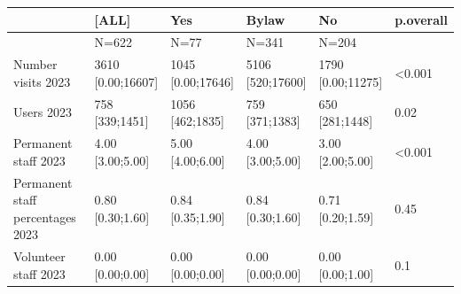 \documentclass[a4paper,
fontsize=11pt,
oneside,
numbers=noperiodatend,
parskip=half-,
bibliography=totoc,
final
]{scrartcl}
\begin{document}
\begin{landscape}
\begin{table}[]\centering
\begin{tabular}{|l|l|l|l|l|l|}
\hline
                                 & \textbf{{[}ALL{]}}       & \textbf{Yes}             & \textbf{Bylaw}           & \textbf{No}            & \textbf{p.overall} \\ \hline
                                 & N=622                    & N=77                     & N=341                    & N=204                  &                    \\ \hline
Number visits 2023               & \makecell{3610 \\ {[}0.00;16607{]}}    & \makecell{1045 \\ {[}0.00;17646{]}}    & \makecell{5106 \\ {[}520;17600{]}}     & \makecell{1790 \\ {[}0.00;11275{]}}  & \textless{}0.001   \\ \hline
Users 2023                       & \makecell{758 \\ {[}339;1451{]}}       & \makecell{1056 \\ {[}462;1835{]}}      & \makecell{759 \\ {[}371;1383{]}}       & \makecell{650 \\ {[}281;1448{]}}     & 0.02               \\ \hline
Permanent staff 2023             & \makecell{4.00 \\ {[}3.00;5.00{]}}     & \makecell{5.00 \\ {[}4.00;6.00{]}}     & \makecell{4.00 \\ {[}3.00;5.00{]}}     & \makecell{3.00 \\ {[}2.00;5.00{]}}   & \textless{}0.001   \\ \hline
Permanent staff percentages 2023 & \makecell{0.80 \\ {[}0.30;1.60{]}}     & \makecell{0.84 \\ {[}0.35;1.90{]}}     & \makecell{0.84 \\ {[}0.30;1.60{]}}     & \makecell{0.71 \\ {[}0.20;1.59{]}}   & 0.45               \\ \hline
Volunteer staff 2023             & \makecell{0.00 \\ {[}0.00;0.00{]}}     & \makecell{0.00 \\ {[}0.00;0.00{]}}     & \makecell{0.00 \\ {[}0.00;0.00{]}}     & \makecell{0.00 \\ {[}0.00;1.00{]}}   & 0.1                \\ \hline

\end{tabular}
\end{table}
\end{landscape}
\end{document}
